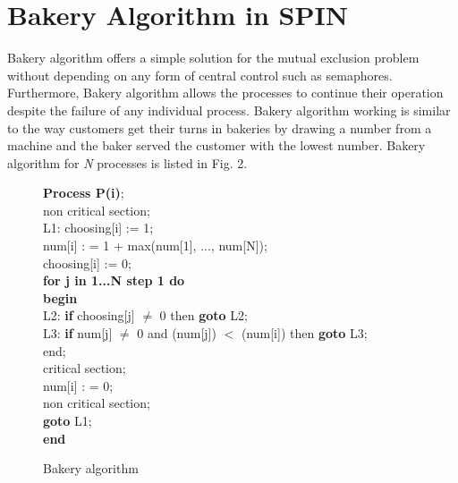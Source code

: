 \documentclass[conference]{IEEEtran}
\begin{document}
\section{Bakery Algorithm in SPIN}
Bakery algorithm \cite{13} offers a simple solution for the mutual exclusion problem without depending on any form of central control such 
as semaphores. Furthermore, Bakery algorithm allows the processes to continue their operation despite the failure of any individual process. 
Bakery algorithm working is similar to the way customers get their turns in bakeries by drawing a number from a machine and the baker served the 
customer with the lowest number. Bakery algorithm for \textit{N} processes is listed in Fig. 2.
\begin{figure}[!ht]
\hspace{0.2cm}\textbf{Process P(i)};\\
\hspace*{0.3cm}non critical section;\\
\hspace*{0.3cm}L1: choosing[i] := 1;\\
\hspace*{0.4cm}num[i] : = 1 + max(num[1], ..., num[N]);\\
\hspace*{0.4cm}choosing[i] := 0;\\
 \hspace*{0.4cm}\textbf{for j in 1...N step 1 do}\\
\hspace*{0.5cm}\textbf{begin}\\
\hspace*{0.5cm}L2: \textbf{if} choosing[j] $\neq$ 0 then \textbf{goto} L2;\\
\hspace*{0.5cm}L3: \textbf{if} num[j] $\neq$ 0 and (num[j]) $<$ (num[i]) then \textbf{goto} L3;\\
\hspace*{0.5cm}end;\\
\hspace*{0.4cm}critical section;\\
\hspace*{0.4cm}num[i] : = 0;\\
\hspace*{0.4cm}non critical section;\\
\hspace*{0.4cm}\textbf{goto} L1;\\
\hspace*{0.2cm}\textbf{end}
\caption{Bakery algorithm \cite{13}}
\end{figure}
\end{document}
